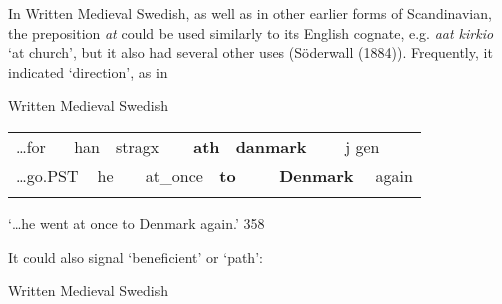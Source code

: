 \begin{styleBodytextC}
In Written Medieval Swedish, as well as in other earlier forms of Scandinavian, the preposition \textit{at} could be used similarly to its English cognate, e.g. \textit{aat kirkio} ‘at church’, but it also had several other uses (Söderwall (1884)). Frequently, it indicated ‘direction’, as in

\end{styleBodytextC}

\begin{listWWNumileveli}
\item {}

\begin{styleExample}
Written Medieval Swedish

\end{styleExample}

\end{listWWNumileveli}

\begin{tabular}{llllllllllll}
\lsptoprule
…for & \multicolumn{2}{l}{han

} & \multicolumn{2}{l}{stragx

} & \multicolumn{2}{l}{{\bfseries ath}

} & \multicolumn{2}{l}{{\bfseries danmark}

} & \multicolumn{2}{l}{j gen

} & \\
\multicolumn{2}{l}{…go.PST

} & \multicolumn{2}{l}{he

} & \multicolumn{2}{l}{at\_once

} & \multicolumn{2}{l}{{\bfseries to}

} & \multicolumn{2}{l}{{\bfseries Denmark}

} & \multicolumn{2}{l}{again

}\\
\lspbottomrule
\end{tabular}

\begin{styleTranslation}
‘…he went at once to Denmark again.’ 358

\end{styleTranslation}

It could also signal ‘beneficient’ or ‘path’:

\begin{listWWNumileveli}
\item {}

\begin{styleExample}
Written Medieval Swedish

\end{styleExample}

\end{listWWNumileveli}

